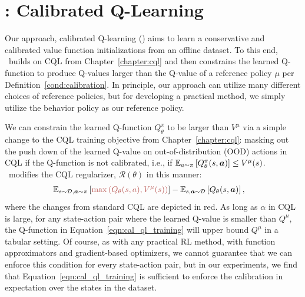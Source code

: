 \vspace{-0.2cm}
\section{\methodname: Calibrated Q-Learning}
\label{sec:empirical-method}
\vspace{-0.25cm}
Our approach, calibrated Q-learning (\methodname) aims to learn a conservative and calibrated value function initializations from an offline dataset. To this end, \methodname\ builds on CQL from Chapter~\ref{chapter:cql} and then constrains the learned Q-function to produce Q-values larger than the Q-value of a reference policy $\mu$ per Definition~\ref{cond:calibration}. In principle, our approach can utilize many different choices of reference policies, but for developing a practical method, we simply utilize the behavior policy as our reference policy.  

 We can constrain the learned Q-function $Q^\pi_\theta$ to be larger than $V^\mu$ via a simple change to the CQL training objective from Chapter~\ref{chapter:cql}: masking out the push down of the learned Q-value on out-of-distribution (OOD) actions in CQL if the Q-function is not calibrated, i.e., if $\mathbb{E}_{a \sim \pi}\left[Q^\pi_\theta(s, \boldsymbol{a})\right] \leq V^\mu(s)$. \methodname\ modifies the CQL regularizer, $\mathcal{R}(\theta)$ in this manner: 
\begin{align}
\label{eqn:cal_ql_training}
\!\!\!\!\!\!\mathbb{E}_{\bs \sim \mathcal{D}, \mathbf{a} \sim \pi} \brac{{\color[HTML]{B85450}{\max \left( Q_\theta(s,a), V^\mu(s) \right)}} } - \mathbb{E}_{\bs, \mathbf{a} \sim \mathcal{D}}\left[Q_\theta(\bs,\mathbf{a})\right],
\end{align}
where the changes from standard CQL are depicted in {\color[HTML]{B85450} red}. As long as $\alpha$ in CQL is large, for any state-action pair where the learned Q-value is smaller than $Q^\mu$, the Q-function in Equation~\ref{eqn:cal_ql_training} will upper bound $Q^\mu$ in a tabular setting. Of course, as with any practical RL method, with function approximators and gradient-based optimizers, we cannot guarantee that we can enforce this condition for every state-action pair, but in our experiments, we find that Equation~\ref{eqn:cal_ql_training} is sufficient to enforce the calibration in expectation over the states in the dataset.         

